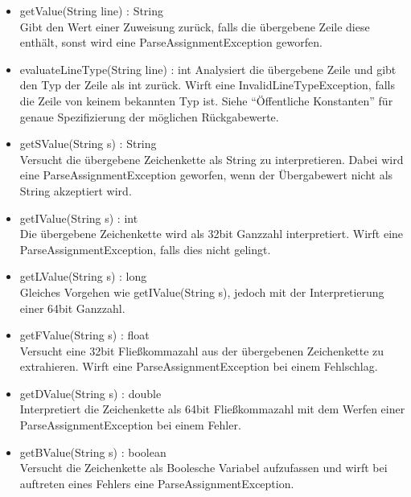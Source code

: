 \documentclass[parskip=full]{scrartcl}
\begin{document}
\begin{itemize}
\begin{itemize}
\item getValue(String line) : String \\
Gibt den Wert einer Zuweisung zurück, falls die übergebene Zeile diese enthält, sonst wird eine ParseAssignmentException geworfen.
\item evaluateLineType(String line) : int
Analysiert die übergebene Zeile und gibt den Typ der Zeile als int zurück.
Wirft eine InvalidLineTypeException, falls die Zeile von keinem bekannten Typ ist.
Siehe \enquote{Öffentliche Konstanten} für genaue Spezifizierung der möglichen Rückgabewerte.
\item getSValue(String s) : String \\
Versucht die übergebene Zeichenkette als String zu interpretieren.
Dabei wird eine ParseAssignmentException geworfen, wenn der Übergabewert nicht als String akzeptiert wird.
\item getIValue(String s) : int \\
Die übergebene Zeichenkette wird als 32bit Ganzzahl interpretiert.
Wirft eine ParseAssignmentException, falls dies nicht gelingt.
\item getLValue(String s) : long \\
Gleiches Vorgehen wie getIValue(String s), jedoch mit der Interpretierung einer 64bit Ganzzahl.
\item getFValue(String s) : float \\
Versucht eine 32bit Fließkommazahl aus der übergebenen Zeichenkette zu extrahieren.
Wirft eine ParseAssignmentException bei einem Fehlschlag.
\item getDValue(String s) : double \\
Interpretiert die Zeichenkette als 64bit Fließkommazahl mit dem Werfen einer ParseAssignmentException bei einem Fehler.
\item getBValue(String s) : boolean \\
Versucht die Zeichenkette als Boolesche Variabel aufzufassen und wirft bei auftreten eines Fehlers eine ParseAssignmentException.
\end{itemize}
\end{itemize}
\end{document}
